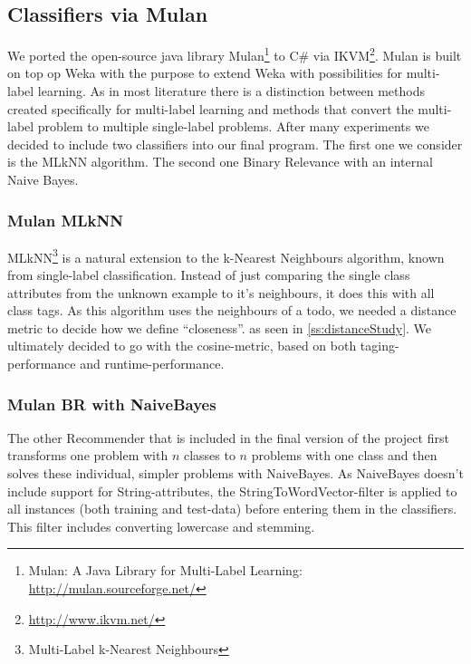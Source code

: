 \documentclass[a4paper,titlepage]{article}
\begin{document}
\subsection{Classifiers via Mulan}

We ported the open-source java library Mulan\footnote{Mulan: A Java Library for Multi-Label Learning: \url{http://mulan.sourceforge.net/}} to C\# via IKVM\footnote{\url{http://www.ikvm.net/}}. Mulan is built on top op Weka with the purpose to extend Weka with possibilities for multi-label learning.
As in most literature there is a distinction between methods created specifically for multi-label learning and methods that convert the multi-label problem to multiple single-label problems.
After many experiments we decided to include two classifiers into our final program.
The first one we consider is the MLkNN algorithm. The second one Binary Relevance with an internal Naive Bayes.

\subsubsection{Mulan MLkNN}
\label{ss:mlknn}
MLkNN\footnote{Multi-Label k-Nearest Neighbours} is a natural extension to the k-Nearest Neighbours algorithm, known from single-label classification. Instead of just comparing the single class attributes from the unknown example to it's neighbours, it does this with all class tags.
As this algorithm uses the neighbours of a todo, we needed a distance metric to decide how we define ``closeness''.  as seen in \ref{ss:distanceStudy}. We ultimately decided to go with the cosine-metric, based on both taging-performance and runtime-performance.

\subsubsection{Mulan BR with NaiveBayes}
The other Recommender that is included in the final version of the project first transforms one problem with $n$ classes to $n$ problems with one class and then solves these individual, simpler problems with NaiveBayes. As NaiveBayes doesn't include support for String-attributes, the StringToWordVector-filter is applied to all instances (both training and test-data) before entering them in the classifiers. This filter includes converting lowercase and stemming.

\label{ss:sovectorclassif}
\end{document}
